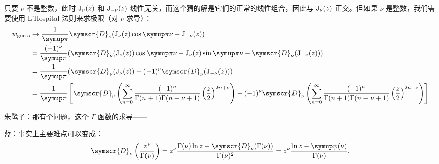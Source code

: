 只要 \(\nu \) 不是整数，此时 \(\operatorname{J}_ \nu (z)\) 和 \(\operatorname{J}_{-\nu }(z)\) 线性无关，而这个猜的解是它们的正常的线性组合，因此与 \(\operatorname{J}_ \nu (z)\) 正交。但如果  \(\nu \) 是整数，我们需要使用 L'Hospital 法则来求极限（对 \(\nu \) 求导）：
\[
	\begin{aligned}
		w_{\rm guess} & \to \frac{1}{\symup \pi }\symscr{D} _ \nu (\besselj_ \nu (z)\cos \symup \pi \nu - \besselj_{ -\nu} (z) )                                                                                                                                                                                                                     \\
		              & =\frac{(-1)^\nu }{\symup \pi }(\symscr{D} _ \nu( \besselj_ \nu (z))\cos \symup \pi \nu -\besselj_ \nu (z)\sin \symup \pi \nu - \symscr{D} _ \nu( \besselj_{ -\nu} (z) ))                                                                                                                                                     \\
		              & =\frac{1}{\symup \pi }(\symscr{D} _ \nu( \besselj_ \nu (z)) - (-1)^\nu \symscr{D} _ \nu( \besselj_{ -\nu} (z) ))                                                                                                                                                                                                             \\
		              & =\frac{1}{\symup \pi } \left[ \symscr{D} _ \nu\left(  \sum_{n=0}^{\infty} \frac{(-1)^n}{\Gamma (n+1)\Gamma (n+\nu +1)} \left( \frac{z}{2} \right) ^{2n+\nu }\right) -(-1)^\nu\symscr{D} _ \nu\left(  \sum_{n=0 }^{\infty} \frac{(-1)^n}{\Gamma (n+1)\Gamma (n-\nu +1)} \left( \frac{z}{2} \right) ^{2n-\nu }\right)  \right]
	\end{aligned}
\]

朱鹭子：那有个问题，这个 \(\Gamma \)  函数的求导——

蓝：事实上主要难点可以变成：
\[
	\symscr{D} _{\nu }\left( \frac{z^ \nu }{\Gamma (\nu )} \right) = z^\nu \frac{\Gamma (\nu )\ln z-\symscr{D} _{\nu }(\Gamma (\nu ))}{\Gamma (\nu )^2}=z^\nu  \frac{\ln z-\symup \psi (\nu )}{\Gamma (\nu )}
	.\]

